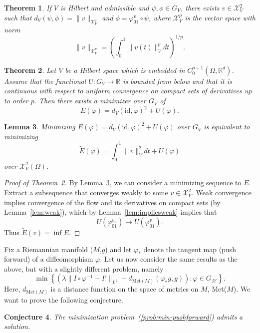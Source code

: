 \documentclass{article}
\theoremstyle{plain}
\newtheorem{teo}{Theorem}[section]
\newtheorem{lem}[teo]{Lemma}
\newtheorem{con}[teo]{Conjecture}
\theoremstyle{definition}
\numberwithin{equation}{section}
\newcommand{\R}{\ensuremath{\mathbb{R}}}
\newcommand{\id}{\ensuremath{\mathrm{id}}}
\begin{document}
\begin{teo}
If $V$ is Hilbert and admissible and $\psi,\phi\in G_V$, there exists $v\in\mathcal{X}_V^2$ such that $d_V(\psi,\phi)=\|v\|_{\mathcal{X}_V^2}$ and $\phi=\varphi_{01}^v\circ\psi$, where  $\mathcal{X}_V^p$ is the vector space with norm
\[
\|v\|_{\mathcal{X}_V^p}=\left(\int_0^1 \|v(t)\|_V^p dt\right)^{1/p}.
\]
\end{teo}

\begin{teo}
\label{teo:lddmm-conv}
Let $V$ be a Hilbert space which is embedded in $C_0^{p+1}(\Omega,\R^d)$. Assume that the functional $U:G_V\to\R$ is bounded from below and that it is continuous with respect to uniform convergence on compact sets of derivatives up to order $p$. Then there exists a minimizer over $G_V$ of \[E(\varphi)=d_V(\id,\varphi)^2+U(\varphi).\]
\end{teo}

\begin{lem}
\label{lem:minim}
Minimizing $E(\varphi)=d_V(\id,\varphi)^2+U(\varphi)$ over $G_V$ is equivalent to minimizing 
\[
\tilde{E}(\varphi)=\int_0^1\|v\|_V^2dt + U(\varphi)
\]
over $\mathcal{X}_V^2(\Omega)$.
\end{lem}

\begin{proof}[Proof of Theorem~\ref{teo:lddmm-conv}]
By Lemma~\ref{lem:minim}, we can consider a minimizing sequence to $\tilde{E}$. Extract a subsequence that converges weakly to some $v\in\mathcal{X}_V^2$. Weak convergence implies convergence of the flow and its derivatives on compact sets (by Lemma~\ref{lem:weak}), which by Lemma~\ref{lem:impliesweak} implies that
\[
U(\varphi_{01}^{v_n})\to U(\varphi_{01}^v).
\]
Thus $\tilde{E}(v)=\inf E$.
\end{proof}

Fix a Riemannian manifold ($M$,$g$) and let $\varphi_*$ denote the tangent map (push forward) of a diffeomorphism $\varphi$. Let us now consider the same results as the above, but with a slightly different problem, namely
%
\begin{equation}
\label{prob:min-pushforward}
\min\left\{\left(\lambda\|I\circ\varphi^{-1}-I'\|_{L^2}+d_{\mathrm{Met}(M)}(\varphi_*g,g)\right) : \varphi\in G_\mathcal{H} \right\}.
\end{equation}
%
Here, $d_{\mathrm{Met}(M)}$ is a distance function on the space of metrics on $M$, Met($M$).
We want to prove the following conjecture.

\begin{con}
The minimization problem~(\ref{prob:min-pushforward}) admits a solution.
\end{con}
\end{document}
